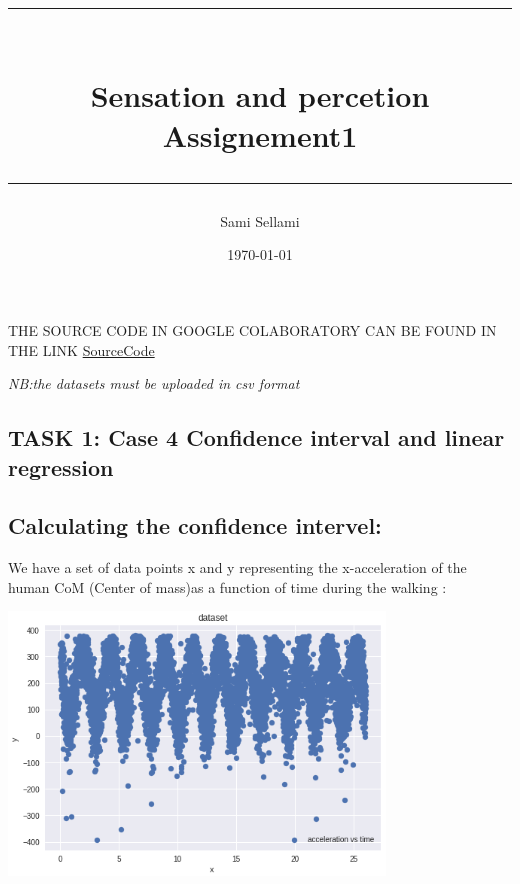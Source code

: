 \documentclass[12pt,a4paper]{report}
\title{
\rule{15cm}{1pt} \\
\Large {\bfseries Sensation and percetion} \\
\Large {\bfseries Assignement1}\\
\rule{15cm}{1pt}}
\author{Sami Sellami}
\date{\today}
\begin{document}
\setcounter{page}{1}
\setcounter{secnumdepth}{1}
	
\selectfont

\maketitle

\titlelabel{\thetitle)\quad}
\titlespacing{\chapter}{0cm}{0cm}{0cm}
\titlespacing{\section}{0.2cm}{0cm}{0cm}

THE SOURCE CODE IN GOOGLE COLABORATORY CAN BE FOUND IN THE LINK 
\href{https://colab.research.google.com/drive/1ftF9_4nVgUtGdKd0OFuLRP90zY1X1Ok4}{SourceCode}  

\textit{NB:the datasets must be uploaded in csv format}
\subsection{TASK 1: Case 4 Confidence interval and linear regression}
\subsection{Calculating the confidence intervel:}

We have a set of data points x and y representing the x-acceleration of the human CoM (Center of mass)as a function of time during the walking :

\begin{center}
\includegraphics[width=10cm]{Capture1.png}
\end{center}
\end{document}
